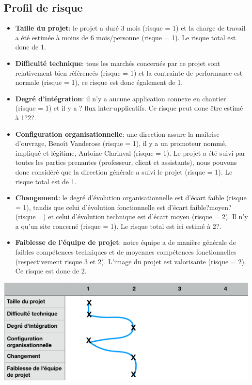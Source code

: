 \documentclass[t, 12pt, usenames,dvipsnames]{article}
\begin{document}
    \subsection{Profil de risque}
        \begin{itemize}
            \item \textbf{Taille du projet}: le projet a duré 3 mois (risque = 1) et la charge de travail a été estimée à moins de 6 mois/personne (risque = 1). Le risque total est donc de 1.
            \item \textbf{Difficulté technique}: tous les marchés concernés par ce projet sont relativement bien référencés (risque = 1) et la contrainte de performance est normale (risque = 1), ce risque est donc également de 1.
            \item \textbf{Degré d'intégration}: il n'y a aucune application connexe en chantier (risque = 1) et il y a ? flux inter-applicatifs. Ce risque peut donc être estimé à 1?2?.
            \item \textbf{Configuration organisationnelle}: une direction assure la maîtrise d'ouvrage, Benoît Vanderose (risque = 1), il y a un promoteur nommé, impliqué et légitime, Antoine Clarinval (risque = 1). Le projet a été suivi par toutes les parties prenantes (professeur, client et assistants), nous pouvons donc considéré que la direction générale a suivi le projet (risque = 1). Le risque total est de 1.
            \item \textbf{Changement}: le degré d'évolution organisationnelle est d'écart faible (risque = 1), tandis que celui d'évolution fonctionnelle est d'écart faible?moyen? (risque =) et celui d'évolution technique est d'écart moyen (risque = 2). Il n'y a qu'un site concerné (risque = 1). Le risque total est ici estimé à 2?.
            \item \textbf{Faiblesse de l'équipe de projet}: notre équipe a de manière générale de faibles compétences techniques et de moyennes compétences fonctionnelles (respectivement risque 3 et 2). L'image du projet est valorisante (risque = 2). Ce risque est donc de 2.
        \end{itemize}
        
        \begin{center}                               
            \includegraphics[scale=.8]{images/ProfilRisque.png}
            \label{fig:profil_risque}
        \end{center}
    
\end{document}
